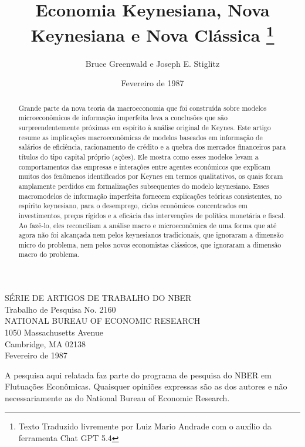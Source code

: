 \documentclass[12pt]{article}
\title{Economia Keynesiana, Nova Keynesiana e Nova Clássica \thanks{Texto Traduzido livremente por Luiz Mario Andrade com o auxílio da ferramenta Chat GPT 5.4}}
\author{Bruce Greenwald e Joseph E. Stiglitz}
\date{Fevereiro de 1987}
\begin{document}
\maketitle

\begin{center}
    SÉRIE DE ARTIGOS DE TRABALHO DO NBER \\[1cm]
    Trabalho de Pesquisa No. 2160 \\[1cm]
    NATIONAL BUREAU OF ECONOMIC RESEARCH \\
    1050 Massachusetts Avenue \\
    Cambridge, MA 02138 \\
    Fevereiro de 1987
\end{center}

\vspace{1cm}

A pesquisa aqui relatada faz parte do programa de pesquisa do NBER em Flutuações Econômicas. Quaisquer opiniões expressas são as dos autores e não necessariamente as do National Bureau of Economic Research.

\newpage

\begin{abstract}
Grande parte da nova teoria da macroeconomia que foi construída sobre modelos microeconômicos de informação imperfeita leva a conclusões que são surpreendentemente próximas em espírito à análise original de Keynes. Este artigo resume as implicações macroeconômicas de modelos baseados em informação de salários de eficiência, racionamento de crédito e a quebra dos mercados financeiros para títulos do tipo capital próprio (ações). Ele mostra como esses modelos levam a comportamentos das empresas e interações entre agentes econômicos que explicam muitos dos fenômenos identificados por Keynes em termos qualitativos, os quais foram amplamente perdidos em formalizações subsequentes do modelo keynesiano. Esses macromodelos de informação imperfeita fornecem explicações teóricas consistentes, no espírito keynesiano, para o desemprego, ciclos econômicos concentrados em investimentos, preços rígidos e a eficácia das intervenções de política monetária e fiscal. Ao fazê-lo, eles reconciliam a análise macro e microeconômica de uma forma que até agora não foi alcançada nem pelos keynesianos tradicionais, que ignoraram a dimensão micro do problema, nem pelos novos economistas clássicos, que ignoraram a dimensão macro do problema.
\end{abstract}

\vspace{2cm}
\end{document}
